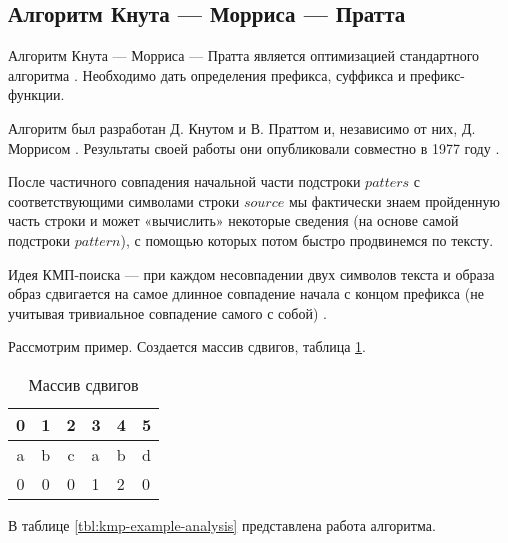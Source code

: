 \documentclass[a4paper,14pt]{extreport}
\begin{document}
\subsection{Алгоритм Кнута — Морриса — Пратта}

Алгоритм Кнута — Морриса — Пратта является оптимизацией стандартного алгоритма \cite{Smyth}.
Необходимо дать определения префикса, суффикса и префикс-функции.

Алгоритм был разработан Д. Кнутом и В. Праттом и, независимо от них, Д. Моррисом \cite{Kormen}.
Результаты своей работы они опубликовали совместно в 1977 году \cite{Knuth}.

После частичного совпадения начальной части подстроки $patters$ с соответствующими символами строки $source$ мы фактически знаем пройденную часть строки и может «вычислить» некоторые сведения (на основе самой подстроки $pattern$), с помощью которых потом быстро продвинемся по тексту.

Идея КМП-поиска — при каждом несовпадении двух символов текста и образа образ сдвигается на самое длинное совпадение начала с концом префикса (не учитывая тривиальное совпадение самого с собой) \cite{Okulov}.

Рассмотрим пример. Создается массив сдвигов, таблица \ref{tbl:kmp-shift-analysis}.

\begin{table}[!h]
	\begin{center}
		\begin{tabular}{|c|c|c|l|l|l|}
			\hline
			0 & 1 & 2 & 3 & 4 & 5 \\ \hline
			a & b & c & a & b & d \\ \hline
			0 & 0 & 0 & 1 & 2 & 0 \\ \hline
		\end{tabular}
	\end{center}
	\caption{Массив сдвигов}
	\label{tbl:kmp-shift-analysis}
\end{table}

В таблице \ref{tbl:kmp-example-analysis} представлена работа алгоритма.
\end{document}
